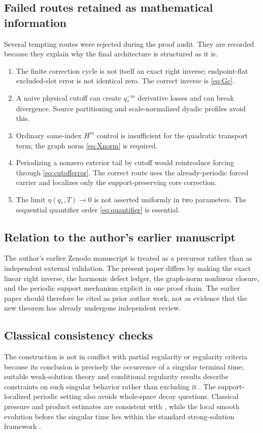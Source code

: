 \documentclass[11pt]{article}
\numberwithin{equation}{section}
\begin{document}
\subsection{Failed routes retained as mathematical information}
Several tempting routes were rejected during the proof audit.  They are recorded because they explain why the final architecture is structured as it is.
\begin{enumerate}[label=(F\arabic*)]
\item The finite correction cycle is not itself an exact right inverse; endpoint-flat excluded-slot error is not identical zero.  The correct inverse is \eqref{eq:Gc}.
\item A naive physical cutoff can create \(q_*^{-m}\) derivative losses and can break divergence.  Source partitioning and scale-normalized dyadic profiles avoid this.
\item Ordinary same-index \(H^m\) control is insufficient for the quadratic transport term; the graph norm \eqref{eq:Xnorm} is required.
\item Periodizing a nonzero exterior tail by cutoff would reintroduce forcing through \eqref{eq:cutofferror}.  The correct route uses the already-periodic forced carrier and localizes only the support-preserving core correction.
\item The limit \(\eta(q_*,T)\to0\) is not asserted uniformly in two parameters.  The sequential quantifier order \eqref{eq:quantifier} is essential.
\end{enumerate}

\subsection{Relation to the author's earlier manuscript}
The author's earlier Zenodo manuscript \cite{NewtonZenodo22857336} is treated as a precursor rather than as independent external validation.  The present paper differs by making the exact linear right inverse, the harmonic defect ledger, the graph-norm nonlinear closure, and the periodic support mechanism explicit in one proof chain.  The earlier paper should therefore be cited as prior author work, not as evidence that the new theorem has already undergone independent review.

\subsection{Classical consistency checks}
The construction is not in conflict with partial regularity or regularity criteria because its conclusion is precisely the occurrence of a singular terminal time; suitable weak-solution theory and conditional regularity results describe constraints on such singular behavior rather than excluding it \cite{CKN1982,EscauriazaSereginSverak2003,Serrin1962}.  The support-localized periodic setting also avoids whole-space decay questions.  Classical pressure and product estimates are consistent with \cite{Stein1970,KatoPonce1988}, while the local smooth evolution before the singular time lies within the standard strong-solution framework \cite{FujitaKato1964,Kato1984,MajdaBertozzi2002,LemarieRieusset2002}.
\end{document}
